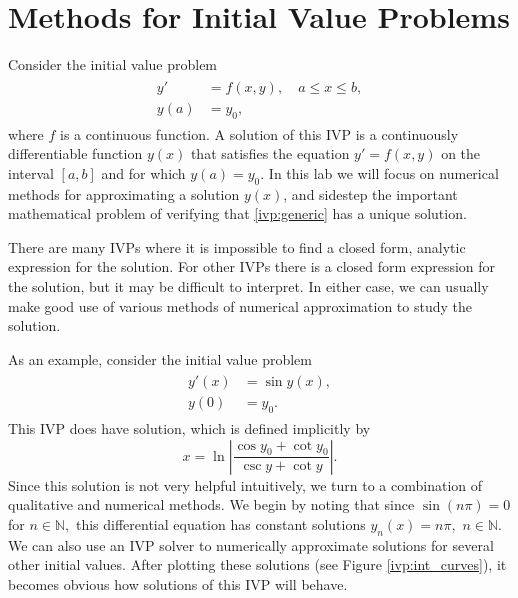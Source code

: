 \label{lab:ivp}


\section*{Methods for Initial Value Problems}
Consider the initial value problem
\begin{align}
	\begin{split}
y' &= f(x,y),\quad a \leq x \leq b, \\
y(a) &= y_0, 
	\end{split}\label{ivp:generic}
\end{align}
where $f$ is a continuous function. 
A solution of this IVP is a continuously differentiable function $y(x)$ that satisfies the equation $y' = f(x,y)$ on the interval $[a,b]$ and for which $y(a) = y_0$. 
In this lab we will focus on numerical methods for approximating a solution $y(x)$, and sidestep the important mathematical problem of verifying that \eqref{ivp:generic} has a unique solution.

There are many IVPs where it is impossible to find a closed form, analytic expression for the solution.
For other IVPs there is a closed form expression for the solution, but it may be difficult to interpret.
In either case, we can usually make good use of various methods of numerical approximation to study the solution. 

As an example, consider the initial value problem
\begin{align}
	\begin{split}
y'(x) &= \sin y(x), \\
y(0) &= y_0.
	\end{split}\label{ivp:example}
\end{align}
This IVP does have solution, which is defined implicitly by
\[x = \ln \left|\frac{\cos y_0 + \cot y_0}{\csc y + \cot y} \right|.\]
Since this solution is not very helpful intuitively, we turn to a combination of qualitative and numerical methods. 
We begin by noting that since $\sin (n \pi) = 0$ for $n \in \mathbb{N},$ this differential equation has constant solutions $y_n(x) = n \pi,$ $n \in \mathbb{N}$. 
We can also use an IVP solver to numerically approximate solutions for several other initial values. 
After plotting these solutions (see Figure \ref{ivp:int_curves}), it becomes  obvious how solutions of this IVP will behave.

